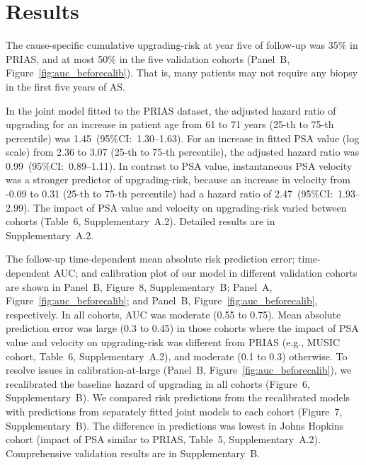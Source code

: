 \section{Results}
The cause-specific cumulative upgrading-risk at year five of follow-up was 35\% in PRIAS, and at most 50\% in the five validation cohorts (Panel~B, Figure~\ref{fig:auc_beforecalib}). That is, many patients may not require any biopsy in the first five years of AS.

In the joint model fitted to the PRIAS dataset, the adjusted hazard ratio of upgrading for an increase in patient age from 61 to 71 years (25-th to 75-th percentile) was 1.45~(95\%CI:~1.30--1.63). For an increase in fitted PSA value (log scale) from 2.36 to 3.07 (25-th to 75-th percentile), the adjusted hazard ratio was 0.99~(95\%CI:~0.89--1.11). In contrast to PSA value, instantaneous PSA velocity was a stronger predictor of upgrading-risk, because an increase in velocity from -0.09 to 0.31 (25-th to 75-th percentile) had a hazard ratio of 2.47~(95\%CI:~1.93--2.99). The impact of PSA value and velocity on upgrading-risk varied between cohorts (Table~6, Supplementary~A.2). Detailed results are in Supplementary~A.2.

The follow-up time-dependent mean absolute risk prediction error; time-dependent AUC; and calibration plot of our model in different validation cohorts are shown in Panel~B, Figure~8, Supplementary~B; Panel~A, Figure~\ref{fig:auc_beforecalib}; and Panel~B, Figure~\ref{fig:auc_beforecalib}, respectively. In all cohorts, AUC was moderate (0.55 to 0.75). Mean absolute prediction error was large (0.3 to 0.45) in those cohorts where the impact of PSA value and velocity on upgrading-risk was different from PRIAS (e.g., MUSIC cohort, Table~6, Supplementary~A.2), and moderate (0.1 to 0.3) otherwise. To resolve issues in calibration-at-large (Panel~B, Figure~\ref{fig:auc_beforecalib}), we recalibrated the baseline hazard of upgrading in all cohorts (Figure~6, Supplementary~B). We compared risk predictions from the recalibrated models with predictions from separately fitted joint models to each cohort (Figure~7, Supplementary~B). The difference in predictions was lowest in Johns Hopkins cohort (impact of PSA similar to PRIAS, Table~5, Supplementary~A.2). Comprehensive validation results are in Supplementary~B.


